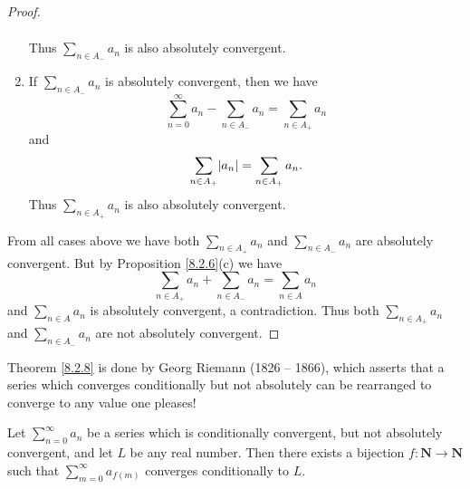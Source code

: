 \begin{proof}
\begin{enumerate}
\begin{align*}
              \end{align*}
              Thus \(\sum_{n \in A_-} a_n\) is also absolutely convergent.
        \item If \(\sum_{n \in A_-} a_n\) is absolutely convergent, then we have
              \[
                  \sum_{n = 0}^\infty a_n - \sum_{n \in A_-} a_n = \sum_{n \in A_+} a_n
              \]
              and
              \[
                  \sum_{n \in A_+} \abs*{a_n} = \sum_{n \in A_+} a_n.
              \]
              Thus \(\sum_{n \in A_+} a_n\) is also absolutely convergent.
    \end{enumerate}
    From all cases above we have both \(\sum_{n \in A_+} a_n\) and \(\sum_{n \in A_-} a_n\) are absolutely convergent.
    But by Proposition \ref{8.2.6}(c) we have
    \[
        \sum_{n \in A_+} a_n + \sum_{n \in A_-} a_n = \sum_{n \in A} a_n
    \]
    and \(\sum_{n \in A} a_n\) is absolutely convergent, a contradiction.
    Thus both \(\sum_{n \in A_+} a_n\) and \(\sum_{n \in A_-} a_n\) are not absolutely convergent.
\end{proof}

\begin{note}
    Theorem \ref{8.2.8} is done by Georg Riemann (1826 -- 1866), which asserts that a series which converges conditionally but not absolutely can be rearranged to converge to any value one pleases!
\end{note}

\begin{theorem}\label{8.2.8}
    Let \(\sum_{n = 0}^\infty a_n\) be a series which is conditionally convergent, but not absolutely convergent, and let \(L\) be any real number.
    Then there exists a bijection \(f : \mathbf{N} \to \mathbf{N}\) such that \(\sum_{m = 0}^\infty a_{f(m)}\) converges conditionally to \(L\).
\end{theorem}


